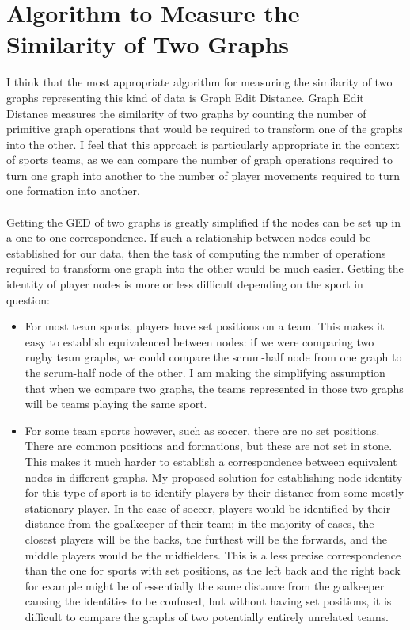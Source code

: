 \documentclass[a4paper,11pt]{article}
\begin{document}
\section{Algorithm to Measure the Similarity of Two Graphs}
I think that the most appropriate algorithm for measuring the similarity of two graphs representing this kind of data is 
Graph Edit Distance. 
Graph Edit Distance measures the similarity of two graphs by counting the number of primitive graph operations that would 
be required to transform one of the graphs into the other. 
I feel that this approach is particularly appropriate in the context of sports teams, as we can compare the number of 
graph operations required to turn one graph into another to the number of player movements required to turn one formation 
into another.
\\\\
Getting the GED of two graphs is greatly simplified if the nodes can be set up in a one-to-one correspondence. 
If such a relationship between nodes could be established for our data, then the task of computing the number of operations 
required to transform one graph into the other would be much easier.
Getting the identity of player nodes is more or less difficult depending on the sport in question:
\begin{itemize}
    \item   For most team sports, players have set positions on a team.
            This makes it easy to establish equivalenced between nodes: if we were comparing two rugby team graphs, we 
            could compare the scrum-half node from one graph to the scrum-half node of the other.
            I am making the simplifying assumption that when we compare two graphs, the teams represented in those two 
            graphs will be teams playing the same sport. 

    \item   For some team sports however, such as soccer, there are no set positions. 
            There are common positions and formations, but these are not set in stone.
            This makes it much harder to establish a correspondence between equivalent nodes in different graphs.
            My proposed solution for establishing node identity for this type of sport is to identify players by their 
            distance from some mostly stationary player. 
            In the case of soccer, players would be identified by their distance from the goalkeeper of their team;
            in the majority of cases, the closest players will be the backs, the furthest will be the forwards, and the 
            middle players would be the midfielders.
            This is a less precise correspondence than the one for sports with set positions, as the left back and the 
            right back for example might be of essentially the same distance from the goalkeeper causing the identities to 
            be confused, but without having set positions, it is difficult to compare the graphs of two potentially entirely 
            unrelated teams.
\end{itemize}
\end{document}
